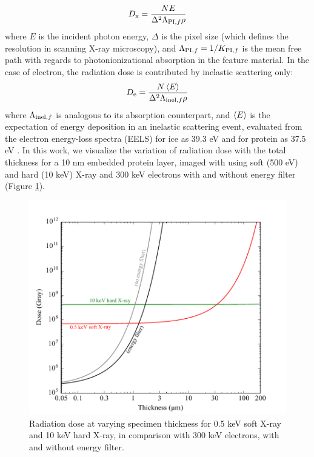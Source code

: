 \documentclass[]{article}
\newcommand\inel{\textup{\scriptsize{inel}}}
\newcommand\PI{\textup{\scriptsize{PI}}}
\begin{document}
\begin{equation}
D_\mathrm{x} = \frac{NE}{\Delta^2 \Lambda_{\PI,f} \rho}
\end{equation}
where $E$ is the incident photon energy, $\Delta$ is the pixel size (which defines the resolution in scanning X-ray microscopy), and $\Lambda_{\PI,f} = 1/K_{\PI,f}$ is the mean free path with regards to photonionizational absorption in the feature material. In the case of electron, the radiation dose is contributed by inelastic scattering only:
\begin{equation}
D_\mathrm{e} = \frac{N\Braket{E}}{\Delta^2 \Lambda_{\inel,f} \rho}
\end{equation}
where $\Lambda_{\inel,f}$ is analogous to its absorption counterpart, and $\Braket{E}$ is the expectation of energy deposition in an inelastic scattering event, evaluated from the electron energy-loss spectra (EELS) for ice as 39.3 eV and for protein as 37.5 eV \cite{Isaacson:1975wr}. In this work, we visualize the variation of radiation dose with the total thickness for a 10 nm embedded protein layer, imaged with using soft (500 eV) and hard (10 keV) X-ray and 300 keV electrons with and without energy filter (Figure \ref{fig:dose}). 

\begin{figure}[t!]
\begin{center}
\includegraphics[scale=0.7]{dose.pdf}
\caption{Radiation dose at varying specimen thickness for 0.5 keV soft X-ray and 10 keV hard X-ray, in comparison with 300 keV electrons, with and without energy filter.}
\label{fig:dose}
\end{center}
\end{figure}
\end{document}
